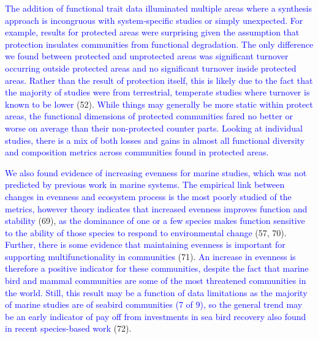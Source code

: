 \documentclass{article}
\begin{document}
\textcolor{blue}{The addition of functional trait data illuminated multiple areas where a synthesis approach is incongruous with system-specific studies or simply unexpected. For example, results for protected areas were surprising given the assumption that protection insulates communities from functional degradation. The only difference we found between protected and unprotected areas was significant turnover occurring outside protected areas and no significant turnover inside protected areas. Rather than the result of protection itself, this is likely due to the fact that the majority of studies were from terrestrial, temperate studies where turnover is known to be lower }(52).
\textcolor{blue}{While things may generally be more static within protect areas, the functional dimensions of protected communities fared no better or worse on average than their non-protected counter parts. Looking at individual studies, there is a mix of both losses and gains in almost all functional diversity and composition metrics across communities found in protected areas.}

\textcolor{blue}{We also found evidence of increasing evenness for marine studies, which was not predicted by previous work in marine systems. The empirical link between changes in evenness and ecosystem process is the most poorly studied of the metrics, however theory indicates that increased evenness improves function and stability }
(69),
\textcolor{blue}{as the dominance of one or a few species makes function sensitive to the ability of those species to respond to environmental change }(57,
70).
\textcolor{blue}{Further, there is some evidence that maintaining evenness is important for supporting multifunctionality in communities }(71).
\textcolor{blue}{An increase in evenness is therefore a positive indicator for these communities, despite the fact that marine bird and mammal communities are some of the most threatened communities in the world. Still, this result may be a function of data limitations as the majority of marine studies are of seabird communities (7 of 9), so the general trend may be an early indicator of pay off from investments in sea bird recovery also found in recent species-based work }(72).
\end{document}

